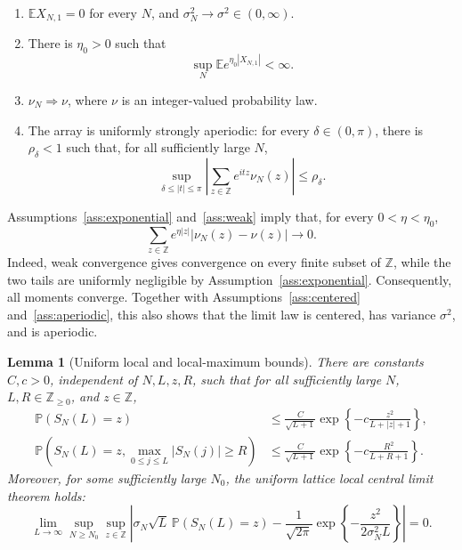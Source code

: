 \documentclass[10pt,a4paper]{amsart}
\newtheorem{lemma}{Lemma}
\newcommand{\Ee}{\mathbb E}
\newcommand{\Pp}{\mathbb P}
\newcommand{\Z}{\mathbb Z}
\begin{document}
\begin{enumerate}[label=\textup{(A\arabic*)},ref=\textup{(A\arabic*)}]
\item \label{ass:centered}
      \(\Ee X_{N,1}=0\) for every \(N\), and
      \(\sigma_N^2\to\sigma^2\in(0,\infty)\).
\item \label{ass:exponential}
      There is \(\eta_0>0\) such that
      \[
        \sup_N \Ee e^{\eta_0|X_{N,1}|}<\infty .
      \]
\item \label{ass:weak}
      \(\nu_N\Rightarrow\nu\), where \(\nu\) is an integer-valued
      probability law.
\item \label{ass:aperiodic}
      The array is uniformly strongly aperiodic: for every
      \(\delta\in(0,\pi)\), there is \(\rho_\delta<1\) such that,
      for all sufficiently large \(N\),
      \[
        \sup_{\delta\le |t|\le\pi}
        \left|\sum_{z\in\Z}e^{itz}\nu_N(z)\right|
        \le \rho_\delta .
      \]
\end{enumerate}
Assumptions~\ref{ass:exponential} and~\ref{ass:weak} imply that, for every
\(0<\eta<\eta_0\),
\begin{equation}
  \sum_{z\in\Z} e^{\eta|z|}
  |\nu_N(z)-\nu(z)|\longrightarrow0 .
  \label{eq:weighted-tv}
\end{equation}
Indeed, weak convergence gives convergence on every finite subset of
\(\Z\), while the two tails are uniformly negligible by
Assumption~\ref{ass:exponential}. Consequently, all moments converge.
Together with Assumptions~\ref{ass:centered} and~\ref{ass:aperiodic}, this
also shows that the limit law is centered, has variance \(\sigma^2\), and is
aperiodic.

\begin{lemma}[Uniform local and local-maximum bounds]
\label{lem:unconditioned}
There are constants \(C,c>0\), independent of \(N,L,z,R\), such that
for all sufficiently large \(N\), \(L,R\in\Z_{\ge0}\), and \(z\in\Z\),
\begin{align}
 \Pp(S_N(L)=z)
 &\le \frac{C}{\sqrt{L+1}}
 \exp\left\{-c\frac{z^2}{L+|z|+1}\right\},       \label{eq:local-bernstein}\\
 \Pp\left(S_N(L)=z,
       \max_{0\le j\le L}|S_N(j)|\ge R\right)
 &\le \frac{C}{\sqrt{L+1}}
 \exp\left\{-c\frac{R^2}{L+R+1}\right\}.         \label{eq:local-max}
\end{align}
Moreover, for some sufficiently large \(N_0\), the uniform lattice
local central limit theorem holds:
\begin{equation}
 \lim_{L\to\infty}\sup_{N\ge N_0}\sup_{z\in\Z}
 \left|
 \sigma_N\sqrt L\,\Pp(S_N(L)=z)
 -\frac1{\sqrt{2\pi}}
  \exp\left\{-\frac{z^2}{2\sigma_N^2L}\right\}
 \right|=0.
 \label{eq:uniform-local-clt}
\end{equation}
\end{lemma}
\end{document}
